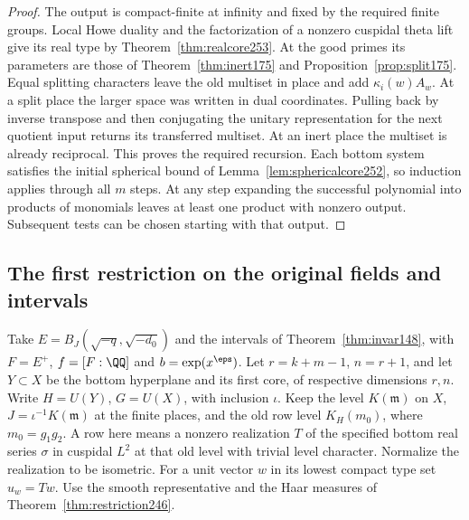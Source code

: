 \documentclass[a4paper,11pt]{article}
\theoremstyle{definition}
\theoremstyle{remark}
\numberwithin{equation}{section}
\begin{document}
\begin{proof}
The output is compact-finite at infinity and fixed by the
required finite groups. Local Howe duality and the factorization
of a nonzero cuspidal theta lift give its real type by
Theorem~\ref{thm:realcore253}. At the good primes its parameters
are those of Theorem~\ref{thm:inert175} and
Proposition~\ref{prop:split175}. Equal splitting characters leave
the old multiset in place and add \(\kappa_i(w)A_w\). At a split
place the larger space was written in dual coordinates. Pulling
back by inverse transpose and then conjugating the unitary
representation for the next quotient input returns its transferred
multiset. At an inert place the multiset is already reciprocal.
This proves the required recursion. Each bottom system satisfies
the initial spherical bound of Lemma~\ref{lem:sphericalcore252},
so induction applies through all \(m\) steps. At any step
expanding the successful polynomial into products of monomials
leaves at least one product with nonzero output. Subsequent tests
can be chosen starting with that output.
\end{proof}

\subsection{The first restriction on the original fields and intervals}\label{nav:V-32}
Take \(E=B_J(\sqrt{-q},\sqrt{-d_0})\) and the intervals of
Theorem~\ref{thm:invar148}, with \(F=E^+\), \(f=[F:\QQ]\) and
\(b=\exp(x^\eps)\). Let \(r=k+m-1\), \(n=r+1\), and let
\(Y\subset X\) be the bottom hyperplane and its first core, of
respective dimensions \(r,n\). Write \(H=U(Y)\), \(G=U(X)\), with
inclusion \(\iota\). Keep the level \(K(\mathfrak m)\) on \(X\),
\(J=\iota^{-1}K(\mathfrak m)\) at the finite places, and the old
row level \(K_H(m_0)\), where \(m_0=g_1g_2\). A row here means a
nonzero realization \(T\) of the specified bottom real series
\(\sigma\) in cuspidal \(L^2\) at that old level with trivial level
character. Normalize the realization to be isometric. For a unit
vector \(w\) in its lowest compact type set \(u_w=Tw\). Use the
smooth representative and the Haar measures of
Theorem~\ref{thm:restriction246}.
\end{document}
